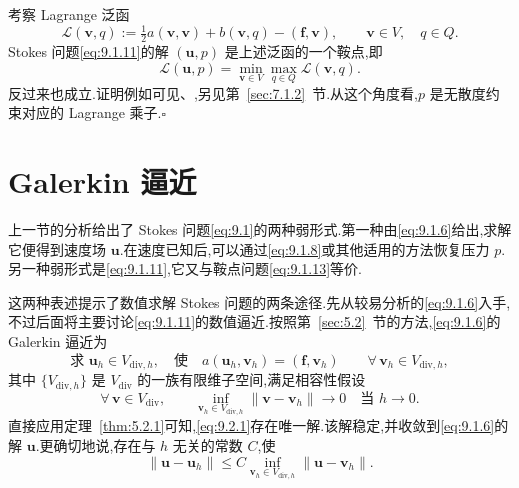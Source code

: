 \begin{note}
考察 Lagrange 泛函
\begin{equation}\label{eq:9.1.12}
  \mathcal L(\boldsymbol{v},q):=\tfrac12a(\boldsymbol{v},\boldsymbol{v})+b(\boldsymbol{v},q)
       -(\boldsymbol{f},\boldsymbol{v}),\qquad \boldsymbol{v}\in V,\quad q\in Q.
\end{equation}
Stokes 问题\eqref{eq:9.1.11}的解 \((\boldsymbol{u},p)\) 是上述泛函的一个鞍点,即
\begin{equation}\label{eq:9.1.13}
  \mathcal L(\boldsymbol{u},p)=\min_{\boldsymbol{v}\in V}\max_{q\in Q}\mathcal L(\boldsymbol{v},q).
\end{equation}
反过来也成立.证明例如可见、,另见第~\ref{sec:7.1.2}~节.从这个角度看,\(p\) 是无散度约束对应的 Lagrange 乘子.\hfill\(\square\)
\end{note}

\section{Galerkin 逼近}\label{sec:9.2}

上一节的分析给出了 Stokes 问题\eqref{eq:9.1}的两种弱形式.第一种由\eqref{eq:9.1.6}给出,求解它便得到速度场 \(\boldsymbol{u}\).在速度已知后,可以通过\eqref{eq:9.1.8}或其他适用的方法恢复压力 \(p\).另一种弱形式是\eqref{eq:9.1.11},它又与鞍点问题\eqref{eq:9.1.13}等价.

这两种表述提示了数值求解 Stokes 问题的两条途径.先从较易分析的\eqref{eq:9.1.6}入手,不过后面将主要讨论\eqref{eq:9.1.11}的数值逼近.按照第~\ref{sec:5.2}~节的方法,\eqref{eq:9.1.6}的 Galerkin 逼近为
\begin{equation}\label{eq:9.2.1}
  \text{求 }\boldsymbol{u}_h\in V_{\mathrm{div},h},\quad\text{使}\quad
    a(\boldsymbol{u}_h,\boldsymbol{v}_h)=(\boldsymbol{f},\boldsymbol{v}_h)
       \qquad\forall\,\boldsymbol{v}_h\in V_{\mathrm{div},h},
\end{equation}
其中 \(\{V_{\mathrm{div},h}\}\) 是 \(V_{\mathrm{div}}\) 的一族有限维子空间,满足相容性假设
\begin{equation}\label{eq:9.2.2}
  \forall\,\boldsymbol{v}\in V_{\mathrm{div}},\qquad
     \inf_{\boldsymbol{v}_h\in V_{\mathrm{div},h}}\|\boldsymbol{v}-\boldsymbol{v}_h\|\to0
       \quad\text{当 }h\to0.
\end{equation}
直接应用定理~\ref{thm:5.2.1}可知,\eqref{eq:9.2.1}存在唯一解.该解稳定,并收敛到\eqref{eq:9.1.6}的解 \(\boldsymbol{u}\).更确切地说,存在与 \(h\) 无关的常数 \(C\),使
\begin{equation}\label{eq:9.2.3}
  \|\boldsymbol{u}-\boldsymbol{u}_h\|\le C\inf_{\boldsymbol{v}_h\in V_{\mathrm{div},h}}
           \|\boldsymbol{u}-\boldsymbol{v}_h\|.
\end{equation}

